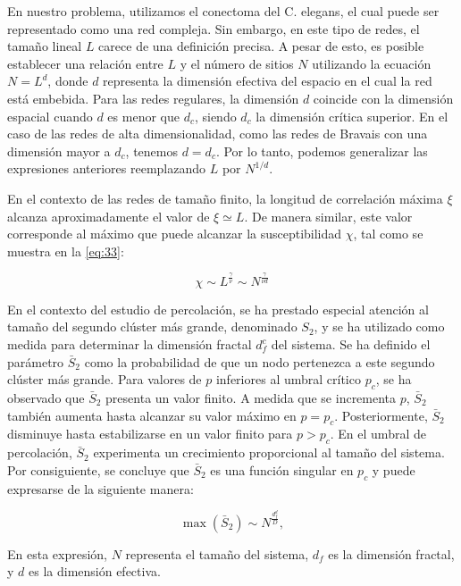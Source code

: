 En nuestro problema, utilizamos el conectoma del C. elegans, el cual puede ser representado como una red compleja.  Sin embargo, en este tipo de redes, el tamaño lineal $L$ carece de una definición precisa. A pesar de esto, es posible establecer una relación entre $L$ y el número de sitios $N$ utilizando la ecuación $N = L^d$, donde $d$ representa la dimensión efectiva del espacio en el cual la red está embebida. Para las redes regulares, la dimensión $d$ coincide con la dimensión espacial cuando $d$ es menor que $d_c$, siendo $d_c$ la dimensión crítica superior. En el caso de las redes de alta dimensionalidad, como las redes de Bravais con una dimensión mayor a $d_c$, tenemos $d = d_c$. Por lo tanto, podemos generalizar las expresiones anteriores reemplazando $L$ por $N^{1/d}$.

En el contexto de las redes de tamaño finito, la longitud de correlación máxima $\xi$ alcanza aproximadamente el valor de $\xi \simeq L$. De manera similar, este valor corresponde al máximo que puede alcanzar la susceptibilidad $\chi$, tal como se muestra en la \cref{eq:33}:

\begin{equation}\label{eq:41}
	\chi \sim L^{\frac{\gamma}{\nu}}\sim N^{\frac{\gamma}{\nu d}}
\end{equation}


En el contexto del estudio de percolación, se ha prestado especial atención al tamaño del segundo clúster más grande, denominado $S_2$, y se ha utilizado como medida para determinar la dimensión fractal $d_f^c$ del sistema. Se ha definido el parámetro $\bar{S}_2$ como la probabilidad de que un nodo pertenezca a este segundo clúster más grande. Para valores de $p$ inferiores al umbral crítico $p_c$, se ha observado que $\bar{S}_2$ presenta un valor finito. A medida que se incrementa $p$, $\bar{S}_2$ también aumenta hasta alcanzar su valor máximo en $p = p_c$. Posteriormente, $\bar{S}_2$ disminuye hasta estabilizarse en un valor finito para $p > p_c$. En el umbral de percolación, $\bar{S}_2$ experimenta un crecimiento proporcional al tamaño del sistema. Por consiguiente, se concluye que $\bar{S}_2$ es una función singular en $p_c$ y puede expresarse de la siguiente manera:


\begin{equation}
\max\left(\bar{S}_2\right)\sim N^{\frac{d_f^d}{D}},
\end{equation}
 
 En esta expresión, $N$ representa el tamaño del sistema, $d_f$ es la dimensión fractal, y $d$ es la dimensión efectiva.
 

